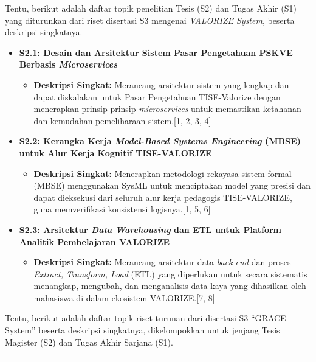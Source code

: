 \documentclass[
  letterpaper,
  DIV=11,
  numbers=noendperiod]{scrreprt}
\providecommand{\tightlist}{%
  \setlength{\itemsep}{0pt}\setlength{\parskip}{0pt}}
\begin{document}
Tentu, berikut adalah daftar topik penelitian Tesis (S2) dan Tugas Akhir
(S1) yang diturunkan dari riset disertasi S3 mengenai \emph{VALORIZE
System}, beserta deskripsi singkatnya.

\begin{itemize}
\tightlist
\item
  \textbf{S2.1: Desain dan Arsitektur Sistem Pasar Pengetahuan PSKVE
  Berbasis \emph{Microservices}}

  \begin{itemize}
  \tightlist
  \item
    \textbf{Deskripsi Singkat:} Merancang arsitektur sistem yang lengkap
    dan dapat diskalakan untuk Pasar Pengetahuan TISE-Valorize dengan
    menerapkan prinsip-prinsip \emph{microservices} untuk memastikan
    ketahanan dan kemudahan pemeliharaan sistem.{[}1, 2, 3, 4{]}
  \end{itemize}
\item
  \textbf{S2.2: Kerangka Kerja \emph{Model-Based Systems Engineering}
  (MBSE) untuk Alur Kerja Kognitif TISE-VALORIZE}

  \begin{itemize}
  \tightlist
  \item
    \textbf{Deskripsi Singkat:} Menerapkan metodologi rekayasa sistem
    formal (MBSE) menggunakan SysML untuk menciptakan model yang presisi
    dan dapat dieksekusi dari seluruh alur kerja pedagogis
    TISE-VALORIZE, guna memverifikasi konsistensi logisnya.{[}1, 5, 6{]}
  \end{itemize}
\item
  \textbf{S2.3: Arsitektur \emph{Data Warehousing} dan ETL untuk
  Platform Analitik Pembelajaran VALORIZE}

  \begin{itemize}
  \tightlist
  \item
    \textbf{Deskripsi Singkat:} Merancang arsitektur data
    \emph{back-end} dan proses \emph{Extract, Transform, Load} (ETL)
    yang diperlukan untuk secara sistematis menangkap, mengubah, dan
    menganalisis data kaya yang dihasilkan oleh mahasiswa di dalam
    ekosistem VALORIZE.{[}7, 8{]}
  \end{itemize}
\end{itemize}

Tentu, berikut adalah daftar topik riset turunan dari disertasi S3
``GRACE System'' beserta deskripsi singkatnya, dikelompokkan untuk
jenjang Tesis Magister (S2) dan Tugas Akhir Sarjana (S1).

\begin{center}\rule{0.5\linewidth}{0.5pt}\end{center}
\end{document}
